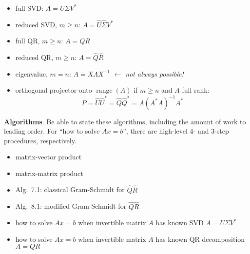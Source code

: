 \documentclass[11pt]{amsart}
\newcommand{\bigspacing}{\renewcommand{\baselinestretch}{1.21}\tiny\normalsize}
\newcommand{\range}{\operatorname{range}}
\begin{document}
\bigspacing

\begin{itemize}
\item full SVD: $A=U \Sigma V^*$
\item reduced SVD, $m\ge n$: $A=\hat U \hat \Sigma V^*$
\item full QR, $m\ge n$: $A=QR$
\item reduced QR, $m\ge n$: $A=\hat Q \hat R$
\item eigenvalue, $m=n$: $A = X\Lambda X^{-1}$ \hfill {\footnotesize\emph{$\leftarrow$ not always possible!}}
\item orthogonal projector onto $\range(A)$ if $m\ge n$ and $A$ full rank:
   $$P = \hat U\hat U^* = \hat Q\hat Q^* = A\left(A^* A\right)^{-1} A^*$$
\end{itemize}

\medskip\noindent \textbf{Algorithms}. Be able to state these algorithms, including the amount of work to leading order.  For ``how to solve $Ax=b$'', there are high-level 4- and 3-step procedures, respectively.
\begin{itemize}
\item matrix-vector product
\item matrix-matrix product
\item Alg.~7.1: classical Gram-Schmidt for $\hat Q \hat R$
\item Alg.~8.1: modified Gram-Schmidt for $\hat Q \hat R$
\item how to solve $Ax=b$ when invertible matrix $A$ has known SVD $A=U\Sigma V^*$
\item how to solve $Ax=b$ when invertible matrix $A$ has known QR decomposition $A=QR$
\end{itemize}
\end{document}
